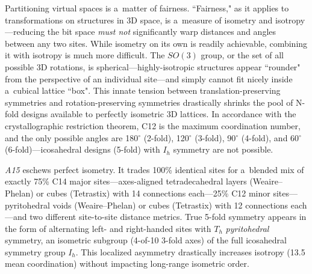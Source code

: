 \documentclass[10pt]{article}
\def\AAAB{\textit{A15}}
\def\TS{Tetrastix} \def\TSP{Tetrastix~Prism} \def\TTSp{The~Tetrastix~prism} \def\tTSp{the~Tetrastix~prism}
\def\WP{Weaire--Phelan} \def\WPH{Weaire--Phelan~Honeycomb} \def\TWPh{The~Weaire--Phelan~honeycomb}
\begin{document}
Partitioning virtual spaces is a~matter of fairness. ``Fairness," as it applies to transformations on structures in 3D space, is
a~measure of isometry and isotropy---reducing the bit space \emph{must not} significantly warp distances and angles between any
two sites. While isometry on its own is readily achievable, combining it with isotropy is much more difficult. The $SO(3)$ group,
or the set of all possible 3D rotations, is spherical---highly-isotropic structures appear ``rounder" from the perspective of an
individual site---and simply cannot fit nicely inside a~cubical lattice ``box". This innate tension between
translation-preserving symmetries and rotation-preserving symmetries drastically shrinks the pool of N-fold designs available to
perfectly isometric 3D lattices. In accordance with the crystallographic restriction theorem, C12 is the maximum coordination
number, and the only possible angles are 180$^{\circ}$ (2-fold), 120$^{\circ}$ (3-fold), 90$^{\circ}$ (4-fold), and 60$^{\circ}$
(6-fold)---icosahedral designs (5-fold) with $I_h$ symmetry are not possible.

\AAAB{} eschews perfect isometry. It trades 100\% identical sites for a~blended mix of exactly 75\% C14 major
sites---axes-aligned tetradecahedral layers (\WP) or cubes (\TS) with 14 connections each---25\% C12 minor sites---pyritohedral
voids (\WP) or cubes (\TS) with 12 connections each---and two different site-to-site distance metrics. True 5-fold symmetry
appears in the form of alternating left- and right-handed sites with $T_h$ \emph{pyritohedral} symmetry, an isometric subgroup
(4-of-10 3-fold axes) of the full icosahedral symmetry group $I_h$. This localized asymmetry drastically increases isotropy (13.5
mean coordination) without impacting long-range isometric order.
\end{document}
